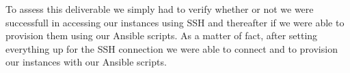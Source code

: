 To assess this deliverable we simply had to verify whether or not we
were successfull in accessing our instances using SSH and thereafter
if we were able to provision them using our Ansible scripts. As a
matter of fact, after setting everything up for the SSH connection we
were able to connect and to provision our instances with our Ansible
scripts.
